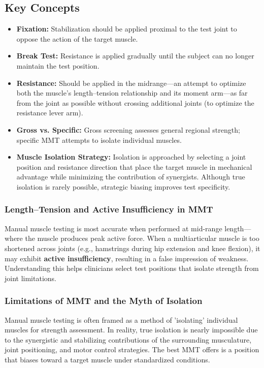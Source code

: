 \subsection*{Key Concepts}
\begin{itemize}
  \item \textbf{Fixation:} Stabilization should be applied proximal to the test joint to oppose the action of the target muscle.
  \item \textbf{Break Test:} Resistance is applied gradually until the subject can no longer maintain the test position.
  \item \textbf{Resistance:} Should be applied in the midrange—an attempt to optimize both the muscle’s length–tension relationship and its moment arm—as far from the joint as possible without crossing additional joints (to optimize the resistance lever arm).
  \item \textbf{Gross vs. Specific:} Gross screening assesses general regional strength; specific MMT attempts to isolate individual muscles.
  \item \textbf{Muscle Isolation Strategy:} Isolation is approached by selecting a joint position and resistance direction that place the target muscle in mechanical advantage while minimizing the contribution of synergists. Although true isolation is rarely possible, strategic biasing improves test specificity.
\end{itemize}

\subsubsection*{Length–Tension and Active Insufficiency in MMT}

Manual muscle testing is most accurate when performed at mid-range length—where the muscle produces peak active force. When a multiarticular muscle is too shortened across joints (e.g., hamstrings during hip extension and knee flexion), it may exhibit \textbf{active insufficiency}, resulting in a false impression of weakness. Understanding this helps clinicians select test positions that isolate strength from joint limitations.

\subsubsection*{Limitations of MMT and the Myth of Isolation}

Manual muscle testing is often framed as a method of 'isolating' individual muscles for strength assessment. In reality, true isolation is nearly impossible due to the synergistic and stabilizing contributions of the surrounding musculature, joint positioning, and motor control strategies. The best MMT offers is a position that biases toward a target muscle under standardized conditions.

